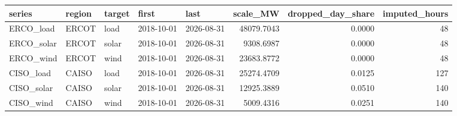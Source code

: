 \begin{tabular}{lllllrrr}
\toprule
series & region & target & first & last & scale_MW & dropped_day_share & imputed_hours \\
\midrule
ERCO_load & ERCOT & load & 2018-10-01 & 2026-08-31 & 48079.7043 & 0.0000 & 48 \\
ERCO_solar & ERCOT & solar & 2018-10-01 & 2026-08-31 & 9308.6987 & 0.0000 & 48 \\
ERCO_wind & ERCOT & wind & 2018-10-01 & 2026-08-31 & 23683.8772 & 0.0000 & 48 \\
CISO_load & CAISO & load & 2018-10-01 & 2026-08-31 & 25274.4709 & 0.0125 & 127 \\
CISO_solar & CAISO & solar & 2018-10-01 & 2026-08-31 & 12925.3889 & 0.0510 & 140 \\
CISO_wind & CAISO & wind & 2018-10-01 & 2026-08-31 & 5009.4316 & 0.0251 & 140 \\
\bottomrule
\end{tabular}
